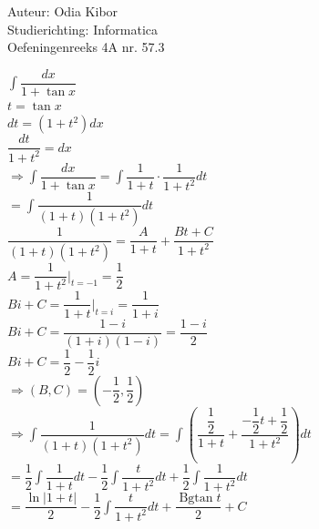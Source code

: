 \documentclass[a4paper]{article}
\begin{document}
  
\noindent \large Auteur: Odia Kibor \\
\noindent \large Studierichting: Informatica\\
\noindent \large Oefeningenreeks 4A nr. 57.3
\\

\medskip

\normalsize


$ \displaystyle\int \dfrac{dx}{1+ \tan x} $\\

$t = \tan x$\\

$dt = (1 + t^2)dx$\\

$ \dfrac{dt}{1 + t^2} = dx$\\

$\Rightarrow \displaystyle\int \dfrac{dx}{1+ \tan x} = \displaystyle\int \dfrac{1}{1+ t} \cdot \dfrac{1}{1 + t^2}dt$\\

$= \displaystyle\int \dfrac{1}{(1 + t)(1 + t^2)}dt$\\

$ \dfrac{1}{(1 + t)(1 + t^2)} = \dfrac{A}{1 + t} + \dfrac{Bt + C}{1 + t^2}$\\

$ A = \dfrac{1}{1 + t^2}\bigg|_{t = -1} = \dfrac{1}{2}$\\

$ Bi + C = \dfrac{1}{1 + t}\bigg|_{t = i} = \dfrac{1}{1+i}$\\

$ Bi + C = \dfrac{1-i}{(1+i)(1-i)} = \dfrac{1-i}{2}$\\

$ Bi + C = \dfrac{1}{2} - \dfrac{1}{2}i$\\

$\Rightarrow (B, C) = \left(-\dfrac{1}{2}, \dfrac{1}{2}\right)$\\

$\Rightarrow \displaystyle\int \dfrac{1}{(1 + t)(1 + t^2)}dt
= \displaystyle\int \left(\dfrac{\dfrac{1}{2}}{1 + t} + \dfrac{-\dfrac{1}{2}t + \dfrac{1}{2}}{1 + t^2}\right)dt$\\

$= \dfrac{1}{2}\displaystyle\int \dfrac{1}{1 + t}dt
-\dfrac{1}{2}\displaystyle\int \dfrac{t}{1 + t^2}dt
+\dfrac{1}{2}\displaystyle\int \dfrac{1}{1 + t^2}dt$\\

$= \dfrac{\ln|1+t|}{2}
-\dfrac{1}{2}\displaystyle\int \dfrac{t}{1 + t^2}dt
+\dfrac{\operatorname{Bgtan} t}{2} + C$\\
\end{document}
